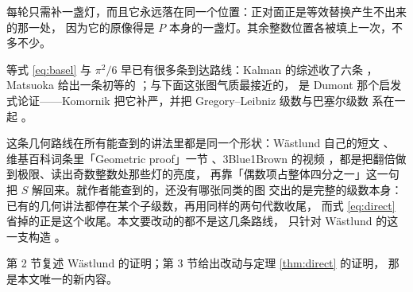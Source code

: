 每轮只需补一盏灯，而且它永远落在同一个位置：正对面正是等效替换产生不出来的那一处，
因为它的原像得是 $P$ 本身的一盏灯。其余整数位置各被填上一次，不多不少。

等式 \eqref{eq:basel} 与 $\pi^{2}/6$ 早已有很多条到达路线：Kalman 的综述收了六条
\cite{kalman}，Matsuoka 给出一条初等的 \cite{matsuoka}；与下面这张图气质最接近的，
是 Dumont 那个启发式论证——Komornik 把它补严，并把 Gregory--Leibniz 级数与巴塞尔级数
系在一起 \cite{komornik}。

这条几何路线在所有能查到的讲法里都是同一个形状：Wästlund 自己的短文 \cite{wastlund}、
维基百科词条里「Geometric proof」一节 \cite{wikipedia}、3Blue1Brown 的视频
\cite{threeblueonebrown}，都是把翻倍做到极限、读出奇数整数处那些灯的亮度，
再靠「偶数项占整体四分之一」这一句把 $S$ 解回来。就作者能查到的，还没有哪张同类的图
交出的是完整的级数本身：已有的几何讲法都停在某个子级数，再用同样的两句代数收尾，
而式 \eqref{eq:direct} 省掉的正是这个收尾。本文要改动的都不是这几条路线，
只针对 Wästlund 的这一支构造 \cite{wastlund}。

第 2 节复述 Wästlund 的证明；第 3 节给出改动与定理 \ref{thm:direct} 的证明，
那是本文唯一的新内容。
